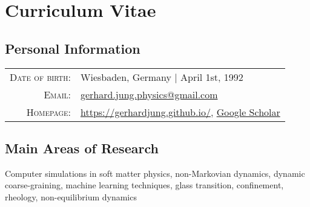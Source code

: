 
\section*{Curriculum Vitae}
\label{sec:cv}


\subsection*{Personal Information}

\begin{tabular}{rl}
	\textsc{Date of birth:} & Wiesbaden, Germany  | April 1st, 1992 \\
	\textsc{Email:}     & \href{gerhard.jung.physics@gmail.com}{\small \url{gerhard.jung.physics@gmail.com}}  \\

\textsc{Homepage:}     & \href{https://gerhardjung.github.io/}{\small \url{https://gerhardjung.github.io/}}, \href{https://scholar.google.com/citations?user=0Wk52qAAAAAJ&hl=en}{\small \url{Google Scholar}}\\
	
\end{tabular}

\subsection*{Main Areas of Research}
Computer simulations in soft matter physics, non-Markovian dynamics, dynamic coarse-graining, machine learning techniques, glass transition, confinement, rheology, non-equilibrium dynamics

